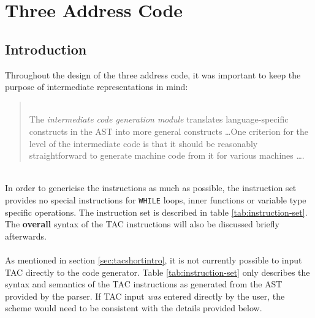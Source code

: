 \chapter{Three Address Code}
\section{Introduction}
\label{sec:tacintro}
Throughout the design of the three address code, it was important to keep the purpose of intermediate representations in mind:

\begin{quotation}
	\ \\The \emph{intermediate code generation module} translates language-specific constructs in the AST into more general constructs \ldots One criterion for the level of the intermediate code is that it should be reasonably straightforward to generate machine code from it for various machines \ldots \cite{grune2000}.
\end{quotation}
\ \\
In order to genericise the instructions as much as possible, the instruction set provides no special instructions for \verb!WHILE! loops, inner functions or variable type specific operations. The instruction set is described in table \ref{tab:instruction-set}. The \textbf{overall} syntax of the TAC instructions will also be discussed briefly afterwards.
\ \\ \ \\
As mentioned in section \ref{sec:tacshortintro}, it is not currently possible to input TAC directly to the code generator. Table \ref{tab:instruction-set} only describes the syntax and semantics of the TAC instructions as generated from the AST provided by the parser. If TAC input \emph{was} entered directly by the user, the scheme would need to be consistent with the details provided below.
\ \\
